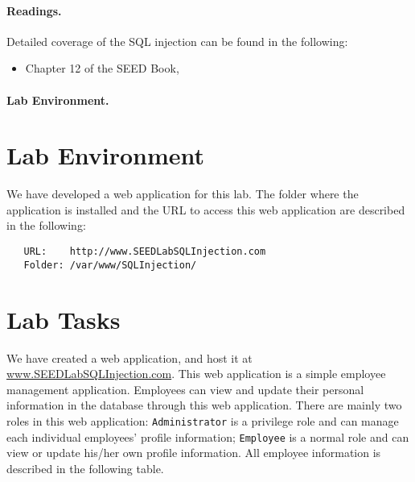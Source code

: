 \paragraph{Readings.}
Detailed coverage of the SQL injection can be found in the following:

\begin{itemize}
\item Chapter 12 of the SEED Book, \seedbook
\end{itemize}

\paragraph{Lab Environment.} \seedenvironment




\section{Lab Environment}


We have developed a web application for this lab. The folder where the 
application is installed and the URL to access this web application are 
described in the following: 

\begin{lstlisting}
   URL:    http://www.SEEDLabSQLInjection.com
   Folder: /var/www/SQLInjection/
\end{lstlisting}
 


\newcommand{\urlorurls}{URL }
\newcommand{\urlisorurlsare}{URL is }





\section{Lab Tasks}

We have created a web application, and host it at \url{www.SEEDLabSQLInjection.com}. 
This web application is a simple employee 
management application. 
Employees can view and update their personal information 
in the database through this web application. 
There are mainly two roles in this web application: 
{\tt Administrator} is a privilege role and can manage each individual
employees' profile information;
{\tt Employee} is a normal role and can view or update his/her own profile 
information. All employee information is described in the following table.


